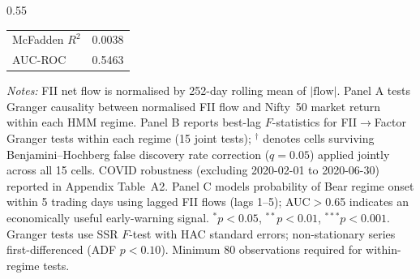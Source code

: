 \begin{table}[htbp]
\begin{subtable}{0.55\textwidth}
\begin{tabular}{lrrrr}
\midrule
McFadden $R^2$ & \multicolumn{4}{c}{0.0038} \\
AUC-ROC & \multicolumn{4}{c}{0.5463} \\
\bottomrule
\end{tabular}
\end{subtable}
\vspace{4pt}
\begin{flushleft}
\scriptsize
\textit{Notes:} FII net flow is normalised by 252-day rolling mean of $|\text{flow}|$. Panel A tests Granger causality between normalised FII flow and Nifty~50 market return within each HMM regime. Panel B reports best-lag $F$-statistics for FII$\rightarrow$Factor Granger tests within each regime (15 joint tests); $^\dagger$ denotes cells surviving Benjamini--Hochberg false discovery rate correction ($q=0.05$) applied jointly across all 15 cells. COVID robustness (excluding 2020-02-01 to 2020-06-30) reported in Appendix Table~A2. Panel C models probability of Bear regime onset within 5 trading days using lagged FII flows (lags 1--5); AUC$>$0.65 indicates an economically useful early-warning signal. $^{*}p<0.05$, $^{**}p<0.01$, $^{***}p<0.001$. Granger tests use SSR $F$-test with HAC standard errors; non-stationary series first-differenced (ADF $p<0.10$). Minimum 80 observations required for within-regime tests.
\end{flushleft}
\end{table}